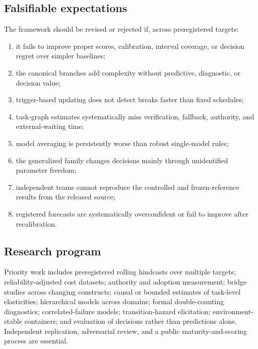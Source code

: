 \subsection{Falsifiable expectations}

The framework should be revised or rejected if, across preregistered targets:
\begin{enumerate}
\item it fails to improve proper scores, calibration, interval coverage, or decision regret over simpler baselines;
\item the canonical branches add complexity without predictive, diagnostic, or decision value;
\item trigger-based updating does not detect breaks faster than fixed schedules;
\item task-graph estimates systematically miss verification, fallback, authority, and external-waiting time;
\item model averaging is persistently worse than robust single-model rules;
\item the generalized family changes decisions mainly through unidentified parameter freedom;
\item independent teams cannot reproduce the controlled and frozen-reference results from the released source;
\item registered forecasts are systematically overconfident or fail to improve after recalibration.
\end{enumerate}

\subsection{Research program}

Priority work includes preregistered rolling hindcasts over multiple targets; reliability-adjusted cost datasets; authority and adoption measurement; bridge studies across changing constructs; causal or bounded estimates of task-level elasticities; hierarchical models across domains; formal double-counting diagnostics; correlated-failure models; transition-hazard elicitation; environment-stable containers; and evaluation of decisions rather than predictions alone. Independent replication, adversarial review, and a public maturity-and-scoring process are essential.
